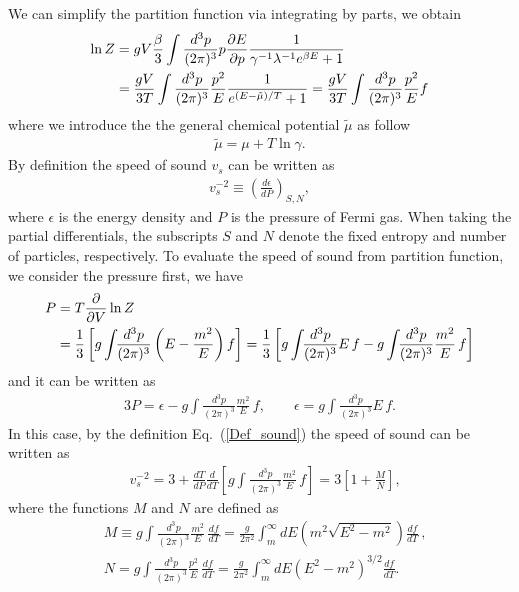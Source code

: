 \documentclass[sn-mathphys,Numbered]{sn-jnl}
\theoremstyle{thmstyleone}%
\theoremstyle{thmstyletwo}%
\theoremstyle{thmstylethree}%
\begin{document}
We can simplify the partition function via integrating by parts, we obtain
\begin{align}
\ln{Z}&=gV\frac{\beta}{3}\int \frac{d^3p}{(2\pi)^3}p\frac{\partial E}{\partial p}\frac{1}{\gamma^{-1}\lambda^{-1}e^{\beta E}+1}\notag\\
&=\frac{gV}{3T}\int\frac{d^3p}{(2\pi)^3}\frac{p^2}{E}\frac{1}{e^{(E-\tilde\mu)/T}+1}
=\frac{gV}{3T}\int \frac{d^3p}{(2\pi)^3}\frac{p^2}{E}f
\end{align}
where we introduce the the general chemical potential $\tilde\mu$ as follow
\begin{align}
\tilde\mu=\mu+T\ln\gamma.
\end{align}
By definition the speed of sound $v_s$ can be written as
\begin{align}\label{Def_sound}
v^{-2}_s\equiv\left(\frac{d\epsilon}{dP}\right)_{S,N},
\end{align}
where $\epsilon$ is the energy density and $P$ is the pressure of Fermi gas. When taking the partial differentials, the subscripts $S$ and $N$ denote the fixed entropy and number of particles, respectively. To evaluate the speed of sound from partition function, we consider the pressure  first, we have
\begin{align}
P&=T\frac{\partial}{\partial V} \ln{Z}\notag\\
&=\frac{1}{3}\left[g\int\!\!\frac{d^3p}{(2\pi)^3}\left(E-\frac{m^2}{E}\right)f\right]=\frac{1}{3}\left[g\int\!\!\frac{d^3p}{(2\pi)^3}E\,f-g\int\!\!\frac{d^3p}{(2\pi)^3}\frac{m^2}{E}\,f\right]
\end{align}
and it can be written as
\begin{align}
3P=\epsilon-g\int\frac{d^3p}{(2\pi)^3}\frac{m^2}{E}\,f,\qquad \epsilon=g\int\frac{d^3p}{(2\pi)^3}E\,f.
\end{align}
In this case, by the definition Eq.~(\ref{Def_sound}) the speed of sound can be written as
\begin{align}\label{Sound_eq}
&v^{-2}_s=3+\frac{dT}{dP}\frac{d}{dT}\left[g\int\!\!\frac{d^3p}{(2\pi)^3}\frac{m^2}{E}\,f\right]=3\left[1+\frac{M}{N}\right],
\end{align}
where the functions $M$ and $N$ are defined as
\begin{align}
\label{M_eq}
&M\equiv g\int\!\!\frac{d^3p}{(2\pi)^3}\frac{m^2}{E}\,\frac{df}{dT}=\frac{g}{2\pi^2}\int_m^\infty\!\!dE \left(m^2\sqrt{E^2-m^2}\right)\frac{df}{dT}\,,\\
\label{N_eq}
&N=g\int\!\!\frac{d^3p}{(2\pi)^3}\frac{p^2}{E}\,\frac{df}{dT}=\frac{g}{2\pi^2}\int_m^\infty\!\!dE \left({E^2-m^2}\right)^{3/2}\frac{df}{dT}.
\end{align}
\end{document}
